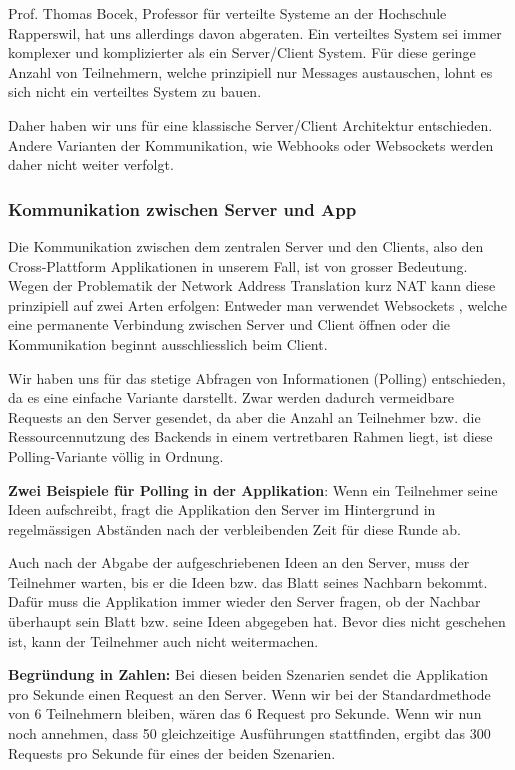 Prof. Thomas Bocek, Professor für verteilte Systeme an der Hochschule Rapperswil, hat uns allerdings davon abgeraten. Ein verteiltes System sei immer komplexer und komplizierter als ein Server/Client System. Für diese geringe Anzahl von Teilnehmern, welche prinzipiell nur Messages austauschen, lohnt es sich nicht ein verteiltes System zu bauen. 


Daher haben wir uns für eine klassische Server/Client Architektur entschieden. Andere Varianten der Kommunikation, wie Webhooks oder Websockets werden daher nicht weiter verfolgt.

\subsubsection{Kommunikation zwischen Server und App}
Die Kommunikation zwischen dem zentralen Server und den Clients, also den Cross-Plattform Applikationen in unserem Fall, ist von grosser Bedeutung. Wegen der Problematik der Network Address Translation kurz NAT \cite{NAT} kann diese prinzipiell auf zwei Arten erfolgen: Entweder man verwendet Websockets \cite{WebSockets}, welche eine permanente Verbindung zwischen Server und Client öffnen oder die Kommunikation beginnt ausschliesslich beim Client. 


Wir haben uns für das stetige Abfragen von Informationen (Polling) entschieden, da es eine einfache Variante darstellt. Zwar werden dadurch vermeidbare Requests an den Server gesendet, da aber die Anzahl an Teilnehmer bzw. die Ressourcennutzung des Backends in einem vertretbaren Rahmen liegt, ist diese Polling-Variante völlig in Ordnung.  

\textbf{Zwei Beispiele für Polling in der Applikation}: Wenn ein Teilnehmer seine Ideen aufschreibt, fragt die Applikation den Server im Hintergrund in regelmässigen Abständen nach der verbleibenden Zeit für diese Runde ab.


Auch nach der Abgabe der aufgeschriebenen Ideen an den Server, muss der Teilnehmer warten, bis er die Ideen bzw. das Blatt seines Nachbarn bekommt. Dafür muss die Applikation immer wieder den Server fragen, ob der Nachbar überhaupt sein Blatt bzw. seine Ideen abgegeben hat. Bevor dies nicht geschehen ist, kann der Teilnehmer auch nicht weitermachen.


\textbf{Begründung in Zahlen:}
Bei diesen beiden Szenarien sendet die Applikation pro Sekunde einen Request an den Server. Wenn wir bei der Standardmethode von 6 Teilnehmern bleiben, wären das 6 Request pro Sekunde. Wenn wir nun noch annehmen, dass 50 gleichzeitige Ausführungen stattfinden, ergibt das 300 Requests pro Sekunde für eines der beiden Szenarien.


